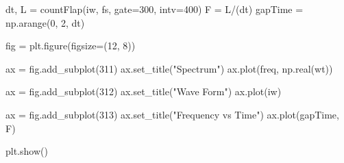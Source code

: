 \documentclass{article}
\begin{document}
\begin{appendices}
\begin{python}
dt, L = countFlap(iw, fs, gate=300, intv=400)
F = L/(dt)
gapTime = np.arange(0, 2, dt)

fig = plt.figure(figsize=(12, 8))

ax = fig.add_subplot(311)
ax.set_title("Spectrum")
ax.plot(freq, np.real(wt))

ax = fig.add_subplot(312)
ax.set_title("Wave Form")
ax.plot(iw)

ax = fig.add_subplot(313)
ax.set_title("Frequency vs Time")
ax.plot(gapTime, F)

plt.show()
\end{python}

\end{appendices}
\end{document}
